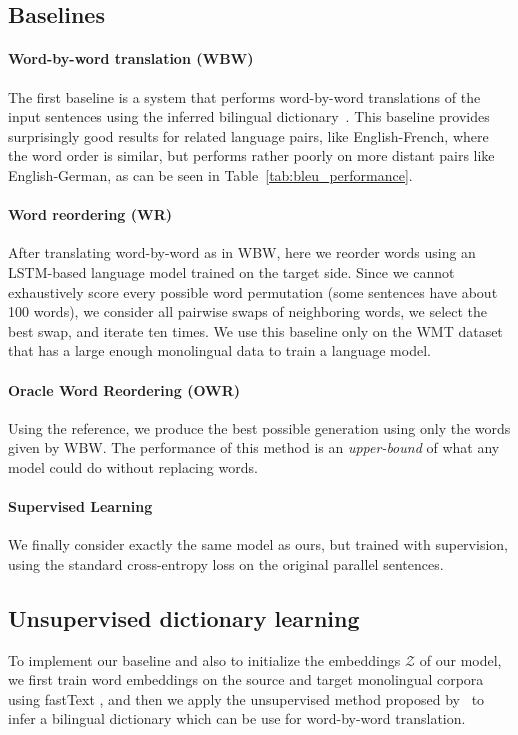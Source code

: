 \documentclass{article} \usepackage{iclr2018_conference,times}
\begin{document}
\subsection{Baselines}

\paragraph{Word-by-word translation (WBW)} The first baseline is a system that performs word-by-word translations of the input sentences using the inferred bilingual dictionary~\citep{wordalign17}. This baseline provides surprisingly good results for related language pairs, like English-French, where the word order is similar, but performs rather poorly on more distant pairs like English-German, as can be seen in Table~\ref{tab:bleu_performance}.

\paragraph{Word reordering (WR)} 
After translating word-by-word as in WBW, here we reorder words using an LSTM-based language model trained on the target side. Since we cannot exhaustively score every possible word permutation (some sentences have about 100 words), we consider all pairwise swaps of neighboring words, we select the best swap, and iterate ten times. We use this baseline only on the WMT dataset that has a large enough monolingual data to train a language model.

\paragraph{Oracle Word Reordering (OWR)} Using the reference, we produce the best possible generation using only the words given by WBW. The performance of this method is an \textit{upper-bound} of what any model could do without replacing words. 

\paragraph{Supervised Learning} 
We finally consider exactly the same model as ours, but trained with supervision, using the standard cross-entropy loss on the original parallel sentences.

\subsection{Unsupervised dictionary learning} To implement our baseline and also to initialize the embeddings $\mathcal{Z}$ of our model, we first train word embeddings on the source and target monolingual corpora using fastText \citep{bojanowski2016enriching}, and then we apply the unsupervised method proposed by~\citet{wordalign17} to infer a bilingual dictionary which can be use for word-by-word translation. 
\end{document}
